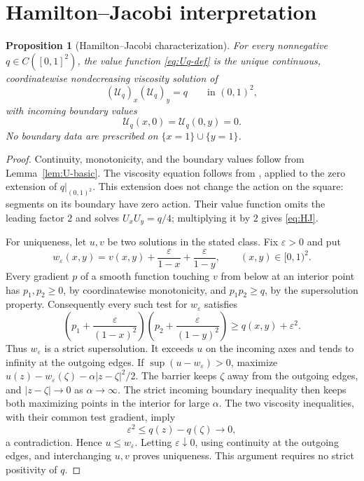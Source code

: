 \documentclass[11pt]{article}
\newtheorem{proposition}[theorem]{Proposition}
\theoremstyle{remark}
\newcommand{\eps}{\varepsilon}
\newcommand{\calU}{\mathcal U}
\begin{document}
\section{Hamilton--Jacobi interpretation}

\begin{proposition}[Hamilton--Jacobi characterization]\label{prop:HJ}
For every nonnegative $q\in C([0,1]^2)$, the value function
\eqref{eq:Uq-def} is the unique continuous, coordinatewise nondecreasing
viscosity solution of
\begin{equation}\label{eq:HJ}
        (\calU_q)_x(\calU_q)_y=q
        \qquad\text{in }(0,1)^2,
\end{equation}
with incoming boundary values
\[
        \calU_q(x,0)=\calU_q(0,y)=0.
\]
No boundary data are prescribed on $\{x=1\}\cup\{y=1\}$.
\end{proposition}

\begin{proof}
Continuity, monotonicity, and the boundary values follow from
Lemma~\ref{lem:U-basic}.  The viscosity equation follows from
\cite[Theorem~2.5]{CalderEsedogluHero2014}, applied to the zero extension of
$q|_{(0,1)^2}$.  This extension does not change the action on the square:
segments on its boundary have zero action.  Their value function omits the
leading factor $2$ and solves $U_xU_y=q/4$; multiplying it by $2$ gives
\eqref{eq:HJ}.

For uniqueness, let $u,v$ be two solutions in the stated class.  Fix
$\eps>0$ and put
\[
 w_\eps(x,y)=v(x,y)+\frac{\eps}{1-x}+\frac{\eps}{1-y},
 \qquad (x,y)\in[0,1)^2.
\]
Every gradient $p$ of a smooth function touching $v$ from below at an
interior point has $p_1,p_2\ge0$, by coordinatewise monotonicity, and
$p_1p_2\ge q$, by the supersolution property.  Consequently every such
test for $w_\eps$ satisfies
\[
 \left(p_1+\frac{\eps}{(1-x)^2}\right)
 \left(p_2+\frac{\eps}{(1-y)^2}\right)
 \ge q(x,y)+\eps^2.
\]
Thus $w_\eps$ is a strict supersolution.  It exceeds $u$ on the incoming
axes and tends to infinity at the outgoing edges.  If
$\sup(u-w_\eps)>0$, maximize
$u(z)-w_\eps(\zeta)-\alpha|z-\zeta|^2/2$.
The barrier keeps $\zeta$ away from the outgoing edges, and
$|z-\zeta|\to0$ as $\alpha\to\infty$.  The strict incoming boundary
inequality then keeps both maximizing points in the interior for large
$\alpha$.  The two viscosity inequalities, with their common test
gradient, imply
\[
        \eps^2\le q(z)-q(\zeta)\longrightarrow0,
\]
a contradiction.  Hence $u\le w_\eps$.  Letting $\eps\downarrow0$,
using continuity at the outgoing edges, and interchanging $u,v$ proves
uniqueness.  This argument requires no strict positivity of $q$.
\end{proof}
\end{document}
